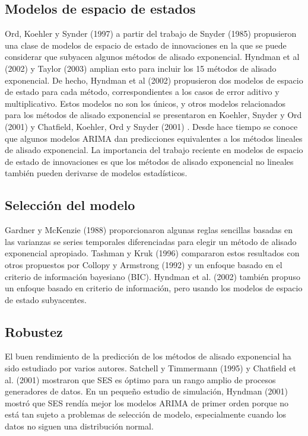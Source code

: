 \documentclass{llncs}
\begin{document}
\subsection{Modelos de espacio de estados}
Ord, Koehler y Synder (1997) \cite{Ord19971621} a partir del trabajo de Snyder (1985)\cite{Snyder1985272}  propusieron una clase de modelos de espacio de estado de innovaciones en la que se puede considerar que subyacen algunos métodos de alisado exponencial. Hyndman et al (2002) \cite{Hyndman2002439} y Taylor (2003) \cite{Taylor2003715} amplian esto para incluir los 15 métodos de alisado exponencial. De hecho, Hyndman et al (2002) \cite{Hyndman2002439}  propusieron dos modelos de espacio de estado para cada método, correspondientes a los casos de error aditivo y multiplicativo. Estos modelos no son los únicos, y otros modelos relacionados para los métodos de alisado exponencial se presentaron en Koehler, Snyder y Ord (2001) \cite{Koehler2001269} y Chatfield, Koehler, Ord y Snyder (2001) \cite{Chatfield2001147}. Desde hace tiempo se conoce que algunos modelos ARIMA dan predicciones equivalentes a los métodos lineales de alisado exponencial. La importancia del trabajo reciente en modelos de espacio de estado de innovaciones es que los métodos de alisado exponencial no lineales también pueden derivarse de modelos estadísticos.

\subsection{Selección del modelo}
Gardner y McKenzie (1988) \cite{GardnerJr1988863} proporcionaron algunas reglas sencillas basadas en las varianzas se series temporales diferenciadas para elegir un método de alisado exponencial apropiado. Tashman y Kruk (1996) \cite{Tashman1996235} compararon estos resultados con otros propuestos por Collopy y Armstrong (1992) \cite{Collopy19921394} y un enfoque basado en el criterio de información bayesiano (BIC). Hyndman et al. (2002) \cite{Hyndman2002439} también propuso un enfoque basado en criterio de información, pero usando los modelos de espacio de estado subyacentes.

\subsection{Robustez}
El buen rendimiento de la predicción de los métodos de alisado exponencial ha sido estudiado por varios autores. Satchell y Timmermann (1995) \cite{Satchell1995407} y Chatfield et al. (2001) \cite{Chatfield2001147} mostraron que SES es óptimo para un rango amplio de procesos generadores de datos. En un pequeño estudio de simulación, Hyndman (2001) mostró que SES rendía mejor los modelos ARIMA de primer orden porque no está tan sujeto a problemas de selección de modelo, especialmente cuando los datos no siguen una distribución normal.
\end{document}
